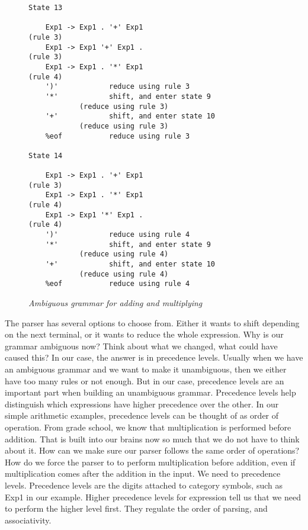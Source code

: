 \documentclass{article}
\begin{document}
\begin{figure}[H]
    \begin{lstlisting}
State 13

	Exp1 -> Exp1 . '+' Exp1                             (rule 3)
	Exp1 -> Exp1 '+' Exp1 .                             (rule 3)
	Exp1 -> Exp1 . '*' Exp1                             (rule 4)
	')'            reduce using rule 3
	'*'            shift, and enter state 9
			(reduce using rule 3)
	'+'            shift, and enter state 10
			(reduce using rule 3)
	%eof           reduce using rule 3

State 14

	Exp1 -> Exp1 . '+' Exp1                             (rule 3)
	Exp1 -> Exp1 . '*' Exp1                             (rule 4)
	Exp1 -> Exp1 '*' Exp1 .                             (rule 4)
	')'            reduce using rule 4
	'*'            shift, and enter state 9
			(reduce using rule 4)
	'+'            shift, and enter state 10
			(reduce using rule 4)
	%eof           reduce using rule 4
    \end{lstlisting}
    \caption{\textit{Ambiguous grammar for adding and multiplying}}
\end{figure}
The parser has several options to choose from. Either it wants to shift depending on the next terminal, or it wants to reduce the whole expression. 
Why is our grammar ambiguous now? Think about what we changed, what could have caused this? In our case, the answer is in precedence levels. Usually when we have an ambiguous grammar and we want to make it unambiguous, then we either have too many rules or not enough. But in our case, precedence levels are an important part when building an unambiguous grammar. Precedence levels help distinguish which expressions have higher precedence over the other. In our simple arithmetic examples, precedence levels can be thought of as order of operation. From grade school, we know that multiplication is performed before addition. That is built into our brains now so much that we do not have to think about it. How can we make sure our parser follows the same order of operations? How do we force the parser to to perform multiplication before addition, even if multiplication comes after the addition in the input. We need to precedence levels. Precedence levels are the digits attached to category symbols, such as Exp1 in our example\cite{IPL}. Higher precedence levels for expression tell us that we need to perform the higher level first. They regulate the order of parsing, and associativity. 
\end{document}
